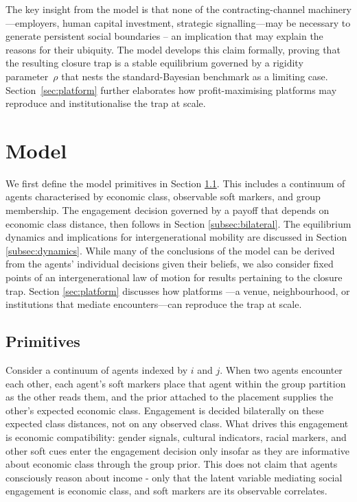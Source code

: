 \documentclass[pdflatex,sn-basic]{sn-jnl}
\theoremstyle{thmstyleone}
\numberwithin{proposition}{subsection}
\begin{document}
The key insight from the model is that none of the contracting-channel machinery---employers,
human capital investment, strategic signalling---may be necessary to generate
persistent social boundaries -- an implication that may explain the reasons for their ubiquity. The model develops this claim formally, proving that the resulting closure trap is a stable equilibrium governed by a rigidity parameter~$\rho$ that nests the
standard-Bayesian benchmark as a limiting case. Section~\ref{sec:platform} further elaborates how profit-maximising platforms may reproduce and institutionalise the trap at scale.

\section{Model}
\label{sec:model}


We first define the model primitives in Section \ref{sec:model_primitives}. This includes a
continuum of agents characterised by economic class, observable soft
markers, and group membership. The engagement decision governed by a payoff that depends on economic class distance, then follows in Section \ref{subsec:bilateral}. The equilibrium dynamics and implications for intergenerational mobility are discussed in Section \ref{subsec:dynamics}. While many of the conclusions of the model can be derived from the agents' individual decisions given their beliefs, we also consider fixed points of an intergenerational law of motion for results pertaining to the closure trap. Section \ref{sec:platform} discusses how platforms ---a venue, neighbourhood, or institutions that mediate encounters---can reproduce the trap at
scale.


\subsection{Primitives}
\label{sec:model_primitives}
Consider a continuum of agents indexed by $i$ and $j$. When two
agents encounter each other, each agent's soft markers place that
agent within the group partition as the other reads them, and the
prior attached to the placement supplies the other's expected economic
class. Engagement is decided bilaterally on these expected class
distances, not on any observed class. What drives this engagement is economic compatibility: gender signals,
cultural indicators, racial markers, and other soft cues enter the engagement decision
only insofar as they are informative about economic class through the
group prior. This does not claim that agents consciously reason about
income - only that the latent variable mediating social
engagement is economic class, and soft markers are its observable
correlates.
\end{document}
